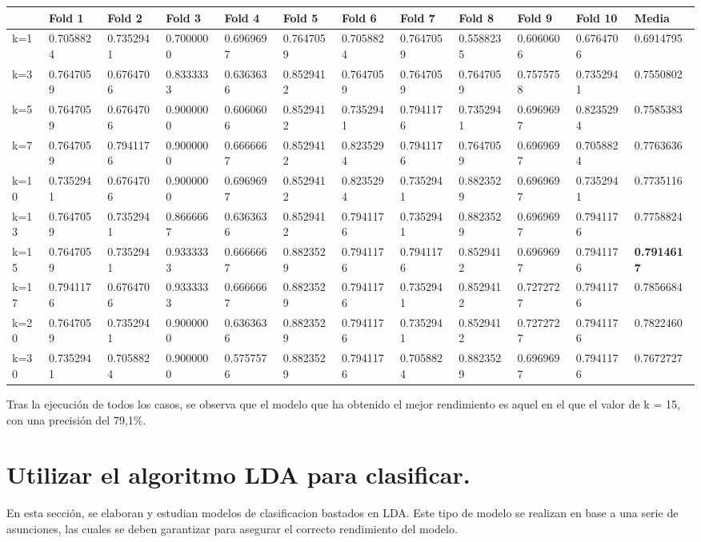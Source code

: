 \newpage
\begin{table}[!h]
	\resizebox{15cm}{!} {
	\begin{tabular}{l|lllllllllll}
		& Fold 1    & Fold 2    & Fold 3    & Fold 4    & Fold 5    & Fold 6    & Fold 7    & Fold 8    & Fold 9    & Fold 10   & Media     \\ \hline
		k=1  & 0.7058824 & 0.7352941 & 0.7000000 & 0.6969697 & 0.7647059 & 0.7058824 & 0.7647059 & 0.5588235 & 0.6060606 & 0.6764706 & 0.6914795 \\
		k=3  & 0.7647059 & 0.6764706 & 0.8333333 & 0.6363636 & 0.8529412 & 0.7647059 & 0.7647059 & 0.7647059 & 0.7575758 & 0.7352941 & 0.7550802 \\
		k=5  & 0.7647059 & 0.6764706 & 0.9000000 & 0.6060606 & 0.8529412 & 0.7352941 & 0.7941176 & 0.7352941 & 0.6969697 & 0.8235294 & 0.7585383 \\
		k=7  & 0.7647059 & 0.7941176 & 0.9000000 & 0.6666667 & 0.8529412 & 0.8235294 & 0.7941176 & 0.7647059 & 0.6969697 & 0.7058824 & 0.7763636 \\
		k=10 & 0.7352941 & 0.6764706 & 0.9000000 & 0.6969697 & 0.8529412 & 0.8235294 & 0.7352941 & 0.8823529 & 0.6969697 & 0.7352941 & 0.7735116 \\
		k=13 & 0.7647059 & 0.7352941 & 0.8666667 & 0.6363636 & 0.8529412 & 0.7941176 & 0.7352941 & 0.8823529 & 0.6969697 & 0.7941176 & 0.7758824 \\
		k=15 & 0.7647059 & 0.7352941 & 0.9333333 & 0.6666667 & 0.8823529 & 0.7941176 & 0.7941176 & 0.8529412 & 0.6969697 & 0.7941176 & \textbf{0.7914617} \\
		k=17 & 0.7941176 & 0.6764706 & 0.9333333 & 0.6666667 & 0.8823529 & 0.7941176 & 0.7352941 & 0.8529412 & 0.7272727 & 0.7941176 & 0.7856684 \\
		k=20 & 0.7647059 & 0.7352941 & 0.9000000 & 0.6363636 & 0.8823529 & 0.7941176 & 0.7352941 & 0.8529412 & 0.7272727 & 0.7941176 & 0.7822460 \\
		k=30 & 0.7352941 & 0.7058824 & 0.9000000 & 0.5757576 & 0.8823529 & 0.7941176 & 0.7058824 & 0.8823529 & 0.6969697 & 0.7941176 & 0.7672727
	\end{tabular}
}
\end{table}

Tras la ejecución de todos los casos, se observa que el modelo que ha obtenido el mejor rendimiento es aquel en el que el valor de k = 15, con una precisión del 79,1\%.


\vspace{1cm}
\section{Utilizar el algoritmo LDA para clasificar.}
En esta sección, se elaboran y estudian modelos de clasificacion bastados en LDA. Este tipo de modelo se realizan en base a una serie de asunciones, las cuales se deben garantizar para asegurar el correcto rendimiento del modelo.\\

